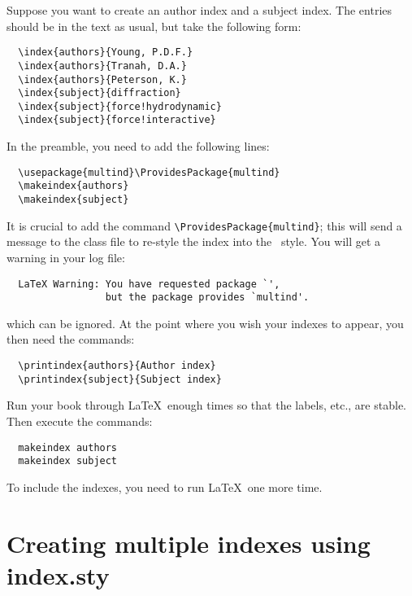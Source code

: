 Suppose you want to create an author index and a subject index. The entries should be in the text as usual, but take the following form:
\begin{verbatim}
  \index{authors}{Young, P.D.F.}
  \index{authors}{Tranah, D.A.}
  \index{authors}{Peterson, K.}
  \index{subject}{diffraction}
  \index{subject}{force!hydrodynamic}
  \index{subject}{force!interactive}
\end{verbatim}
In the preamble, you need to add the following lines:
\begin{verbatim}
  \usepackage{multind}\ProvidesPackage{multind}
  \makeindex{authors}
  \makeindex{subject}
\end{verbatim}
It is crucial to add the command \verb"\ProvidesPackage{multind}"; this will send a message to the class file to re-style the index into the \cambridge\ style. You will get a warning in your log file:
\begin{verbatim}
  LaTeX Warning: You have requested package `',
                 but the package provides `multind'.
\end{verbatim}
which can be ignored. At the point where you wish your indexes to appear, you then need the commands:
\begin{verbatim}
  \printindex{authors}{Author index}
  \printindex{subject}{Subject index}
\end{verbatim}
Run your book through \LaTeX\ enough times so that the labels, etc., are stable. Then execute the commands:
\begin{verbatim}
  makeindex authors
  makeindex subject
\end{verbatim}
To include the indexes, you need to run \LaTeX\ one more time.

\section{Creating multiple indexes using index.sty}

